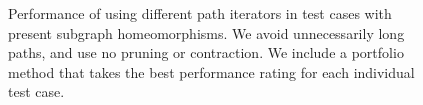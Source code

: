 \begin{figure}
\begin{subfigure} {0.5\linewidth}

\end{subfigure}
\caption{Performance of using different path iterators in test cases with present subgraph homeomorphisms. We avoid unnecessarily long paths, and use no pruning or contraction. We include a portfolio method that takes the best performance rating for each individual test case.}	
\label{fig:pathiterator-performance}
\end{figure}


